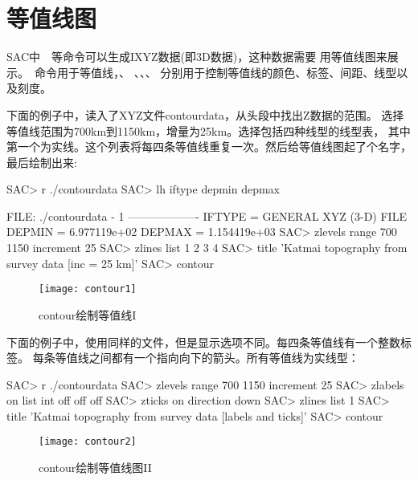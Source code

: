\section{等值线图}
\label{sec:contour}
SAC中~~等命令可以生成IXYZ数据(即3D数据)，这种数据需要
用等值线图来展示。~命令用于等值线，、
、、、
分别用于控制等值线的颜色、标签、间距、线型以及刻度。

下面的例子中，读入了XYZ文件contourdata，从头段中找出Z数据的范围。
选择等值线范围为700km到1150km，增量为25km。选择包括四种线型的线型表，
其中第一个为实线。这个列表将每四条等值线重复一次。然后给等值线图起了个名字，最后绘制出来:
\begin{SACCode}
SAC> r ./contourdata
SAC> lh iftype depmin depmax

  FILE: ./contourdata - 1
 -------------------
       IFTYPE = GENERAL XYZ (3-D) FILE
       DEPMIN = 6.977119e+02
       DEPMAX = 1.154419e+03
SAC> zlevels range 700 1150 increment 25
SAC> zlines list 1 2 3 4
SAC> title 'Katmai topography from survey data [inc = 25 km]'
SAC> contour
\end{SACCode}

\begin{figure}[H]
\centering
\texttt{[image: contour1]}
\caption{contour绘制等值线I}
\end{figure}

下面的例子中，使用同样的文件，但是显示选项不同。每四条等值线有一个整数标签。
每条等值线之间都有一个指向向下的箭头。所有等值线为实线型：
\begin{SACCode}
SAC> r ./contourdata
SAC> zlevels range 700 1150 increment 25
SAC> zlabels on list int off off off
SAC> zticks on direction down
SAC> zlines list 1
SAC> title 'Katmai topography from survey data [labels and ticks]'
SAC> contour
\end{SACCode}

\begin{figure}[H]
\centering
\texttt{[image: contour2]}
\caption{contour绘制等值线图II}
\end{figure}
